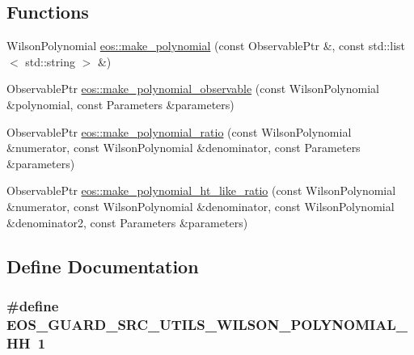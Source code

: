 \subsection*{Functions}
\begin{DoxyCompactItemize}
\item 
WilsonPolynomial \hyperlink{namespaceeos_ae661f13ba6f529e7a5c19865f6528da6}{eos::make\_\-polynomial} (const ObservablePtr \&, const std::list$<$ std::string $>$ \&)
\item 
ObservablePtr \hyperlink{namespaceeos_a702bfbd9d3f9e42e94628616b8760853}{eos::make\_\-polynomial\_\-observable} (const WilsonPolynomial \&polynomial, const Parameters \&parameters)
\item 
ObservablePtr \hyperlink{namespaceeos_aeb8e7723a15217742675f8f16ebbc4f9}{eos::make\_\-polynomial\_\-ratio} (const WilsonPolynomial \&numerator, const WilsonPolynomial \&denominator, const Parameters \&parameters)
\item 
ObservablePtr \hyperlink{namespaceeos_a25bb05f44e3b5f6b6c5197277e22776b}{eos::make\_\-polynomial\_\-ht\_\-like\_\-ratio} (const WilsonPolynomial \&numerator, const WilsonPolynomial \&denominator, const WilsonPolynomial \&denominator2, const Parameters \&parameters)
\end{DoxyCompactItemize}


\subsection{Define Documentation}
\hypertarget{wilson-polynomial_8hh_ae33bd5eb549806a3ba3d61f54994bfba}{
\subsubsection[{EOS\_\-GUARD\_\-SRC\_\-UTILS\_\-WILSON\_\-POLYNOMIAL\_\-HH}]{\setlength{\rightskip}{0pt plus 5cm}\#define EOS\_\-GUARD\_\-SRC\_\-UTILS\_\-WILSON\_\-POLYNOMIAL\_\-HH~1}}
\label{wilson-polynomial_8hh_ae33bd5eb549806a3ba3d61f54994bfba}
